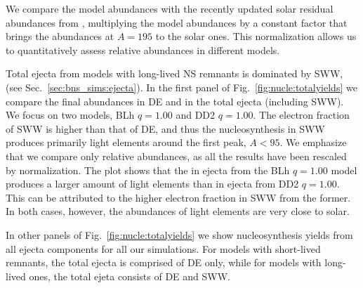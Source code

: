 We compare the model abundances with the recently updated solar residual 
\rproc{} abundances from \citet{Prantzos2020},
%
multiplying the model abundances by a constant factor that brings the abundances 
at $A=195$ to the solar ones. This normalization allows us to quantitatively 
assess relative abundances in different models.

Total ejecta from models with long-lived \ac{NS} remnants is dominated by
\ac{SWW}, %
(see Sec.~\ref{sec:bns_sims:ejecta}). 
%
In the first panel of Fig.~\ref{fig:nucle:totalyields} we compare the final 
abundances in \ac{DE} and in the total ejecta (including \ac{SWW}). We focus 
on two models, BLh $q=1.00$ and DD2 $q=1.00$.
%
The electron fraction of \ac{SWW} is higher than that of \ac{DE}, 
and thus the \rproc{} nucleosynthesis in 
\ac{SWW} produces primarily light elements around the first \rproc{} peak, $A<95$.
We emphasize that we compare only relative abundances, as all the results have 
been rescaled by normalization. 
%
The plot shows that the \rproc{} in ejecta from the BLh $q=1.00$ model produces 
a larger amount of light elements than in ejecta from DD2 $q=1.00$.
%
This can be attributed to the higher electron fraction in \ac{SWW} 
from the former. In both cases, however, the abundances of light elements 
are very close to solar. 


In other panels of Fig.~\ref{fig:nucle:totalyields}
we show nucleosynthesis yields from all ejecta components for all our simulations. 
For models with short-lived \pmerg{} remnants, the total ejecta is comprised 
of \ac{DE} only, while for models with long-lived ones, the total ejeta 
consists of \ac{DE} and \ac{SWW}. 
%
%
%


